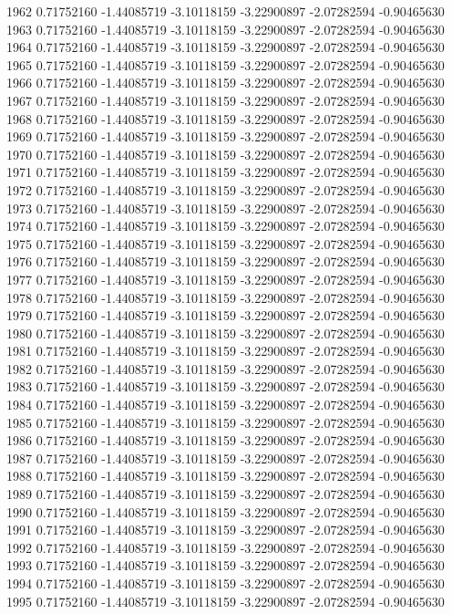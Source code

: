 \documentclass[11pt, a4paper]{article} %
\begin{document}
\begin{Schunk}
\begin{Soutput}
1962  0.71752160 -1.44085719 -3.10118159 -3.22900897 -2.07282594 -0.90465630
1963  0.71752160 -1.44085719 -3.10118159 -3.22900897 -2.07282594 -0.90465630
1964  0.71752160 -1.44085719 -3.10118159 -3.22900897 -2.07282594 -0.90465630
1965  0.71752160 -1.44085719 -3.10118159 -3.22900897 -2.07282594 -0.90465630
1966  0.71752160 -1.44085719 -3.10118159 -3.22900897 -2.07282594 -0.90465630
1967  0.71752160 -1.44085719 -3.10118159 -3.22900897 -2.07282594 -0.90465630
1968  0.71752160 -1.44085719 -3.10118159 -3.22900897 -2.07282594 -0.90465630
1969  0.71752160 -1.44085719 -3.10118159 -3.22900897 -2.07282594 -0.90465630
1970  0.71752160 -1.44085719 -3.10118159 -3.22900897 -2.07282594 -0.90465630
1971  0.71752160 -1.44085719 -3.10118159 -3.22900897 -2.07282594 -0.90465630
1972  0.71752160 -1.44085719 -3.10118159 -3.22900897 -2.07282594 -0.90465630
1973  0.71752160 -1.44085719 -3.10118159 -3.22900897 -2.07282594 -0.90465630
1974  0.71752160 -1.44085719 -3.10118159 -3.22900897 -2.07282594 -0.90465630
1975  0.71752160 -1.44085719 -3.10118159 -3.22900897 -2.07282594 -0.90465630
1976  0.71752160 -1.44085719 -3.10118159 -3.22900897 -2.07282594 -0.90465630
1977  0.71752160 -1.44085719 -3.10118159 -3.22900897 -2.07282594 -0.90465630
1978  0.71752160 -1.44085719 -3.10118159 -3.22900897 -2.07282594 -0.90465630
1979  0.71752160 -1.44085719 -3.10118159 -3.22900897 -2.07282594 -0.90465630
1980  0.71752160 -1.44085719 -3.10118159 -3.22900897 -2.07282594 -0.90465630
1981  0.71752160 -1.44085719 -3.10118159 -3.22900897 -2.07282594 -0.90465630
1982  0.71752160 -1.44085719 -3.10118159 -3.22900897 -2.07282594 -0.90465630
1983  0.71752160 -1.44085719 -3.10118159 -3.22900897 -2.07282594 -0.90465630
1984  0.71752160 -1.44085719 -3.10118159 -3.22900897 -2.07282594 -0.90465630
1985  0.71752160 -1.44085719 -3.10118159 -3.22900897 -2.07282594 -0.90465630
1986  0.71752160 -1.44085719 -3.10118159 -3.22900897 -2.07282594 -0.90465630
1987  0.71752160 -1.44085719 -3.10118159 -3.22900897 -2.07282594 -0.90465630
1988  0.71752160 -1.44085719 -3.10118159 -3.22900897 -2.07282594 -0.90465630
1989  0.71752160 -1.44085719 -3.10118159 -3.22900897 -2.07282594 -0.90465630
1990  0.71752160 -1.44085719 -3.10118159 -3.22900897 -2.07282594 -0.90465630
1991  0.71752160 -1.44085719 -3.10118159 -3.22900897 -2.07282594 -0.90465630
1992  0.71752160 -1.44085719 -3.10118159 -3.22900897 -2.07282594 -0.90465630
1993  0.71752160 -1.44085719 -3.10118159 -3.22900897 -2.07282594 -0.90465630
1994  0.71752160 -1.44085719 -3.10118159 -3.22900897 -2.07282594 -0.90465630
1995  0.71752160 -1.44085719 -3.10118159 -3.22900897 -2.07282594 -0.90465630

\end{Soutput}
\end{Schunk}
\end{document}
